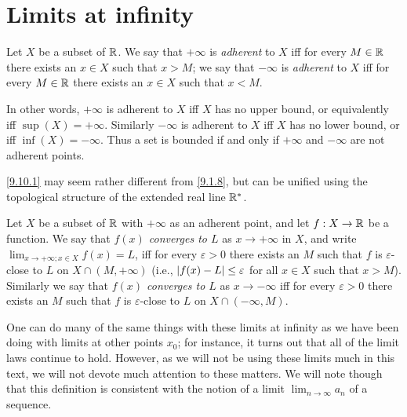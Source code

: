\section{Limits at infinity}\label{sec:9.10}

\begin{defn}\label{9.10.1}
  Let \(X\) be a subset of \(\mathbb{R}\).
  We say that \(+\infty\) is \emph{adherent} to \(X\) iff for every \(M \in \mathbb{R}\) there exists an \(x \in X\) such that \(x > M\);
  we say that \(-\infty\) is \emph{adherent} to \(X\) iff for every \(M \in \mathbb{R}\) there exists an \(x \in X\) such that \(x < M\).
\end{defn}

\begin{note}
  In other words, \(+\infty\) is adherent to \(X\) iff \(X\) has no upper bound, or equivalently iff \(\sup(X) = +\infty\).
  Similarly \(-\infty\) is adherent to \(X\) iff \(X\) has no lower bound, or iff \(\inf(X) = -\infty\).
  Thus a set is bounded if and only if \(+\infty\) and \(-\infty\) are not adherent points.
\end{note}

\begin{rmk}\label{9.10.2}
  \cref{9.10.1} may seem rather different from \cref{9.1.8}, but can be unified using the topological structure of the extended real line \(\mathbb{R}^*\).
\end{rmk}

\begin{defn}\label{9.10.3}
  Let \(X\) be a subset of \(\mathbb{R}\) with \(+\infty\) as an adherent point, and let \(f : X \to \mathbb{R}\) be a function.
  We say that \emph{\(f(x)\) converges to \(L\)} as \(x \to +\infty\) in \(X\), and write \(\lim_{x \to +\infty ; x \in X} f(x) = L\), iff for every \(\varepsilon > 0\) there exists an \(M\) such that \(f\) is \(\varepsilon\)-close to \(L\) on \(X \cap (M, +\infty)\)
  (i.e., \(\left\lvert f(x) - L\right\rvert \leq \varepsilon\) for all \(x \in X\) such that \(x > M\)).
  Similarly we say that \emph{\(f(x)\) converges to \(L\)} as \(x \to -\infty\) iff for every \(\varepsilon > 0\) there exists an \(M\) such that \(f\) is \(\varepsilon\)-close to \(L\) on \(X \cap (-\infty, M)\).
\end{defn}

\begin{note}
  One can do many of the same things with these limits at infinity as we have been doing with limits at other points \(x_0\);
  for instance, it turns out that all of the limit laws continue to hold.
  However, as we will not be using these limits much in this text, we will not devote much attention to these matters.
  We will note though that this definition is consistent with the notion of a limit \(\lim_{n \to \infty} a_n\) of a sequence.
\end{note}

